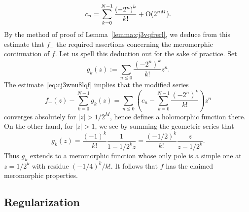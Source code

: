 \documentclass[reqno]{amsart}  \numberwithin{theorem}{section} \numberwithin{equation}{section}
\begin{document}
\begin{example}
\begin{equation}
    c_n = \sum_{k = 0}^{N-1} \frac{{(-2^n)}^k}{k!} + \operatorname{O} (2^{nM}).
  \end{equation}
  By the method of proof of Lemma~\ref{lemma:cj3vqfrerl}, we deduce from this estimate that $f_-$ the required assertions concerning the meromorphic continuation of $f$.  Let us spell this deduction out for the sake of practice.  Set
  \begin{equation*}
    g_k(z) := 
    \sum_{n \leq 0}
    \frac{{(-2^n)}^k}{k!} z^n.
  \end{equation*}
  The estimate~\eqref{eq:cj3wnu8lqf} implies that the modified series
  \begin{equation}\label{eq:cj3wnu7518}
    f_-(z)
    -
    \sum_{k = 0}^{N-1}
    g_k(z)
    = 
    \sum_{n \leq 0}
    \left( c_n -
      \sum_{k = 0}^{N-1} \frac{{(-2^n)}^k}{k!}
    \right) z^n
  \end{equation}
  converges absolutely for $\lvert z \rvert > 1 / 2^M$, hence defines a holomorphic function there.  On the other hand, for $\lvert z \rvert > 1$, we see by summing the geometric series that
  \begin{equation*}
    g_k(z)
    =
    \frac{{(-1)}^k}{k!}
    \frac{1}{1 - 1 / 2^k z}
    =
    \frac{{(-1/2)}^k}{k!}
    \frac{z}{z - 1 / 2^k}.
  \end{equation*}
  Thus $g_k$ extends to a meromorphic function whose only pole is a simple one at $z = 1/2^k$ with residue ${(-1/4)}^k / k!$.  It follows that $f$ has the claimed meromorphic properties.
\end{example}

\subsection{Regularization}\label{sec:cj4unj4gyo}
\end{document}
